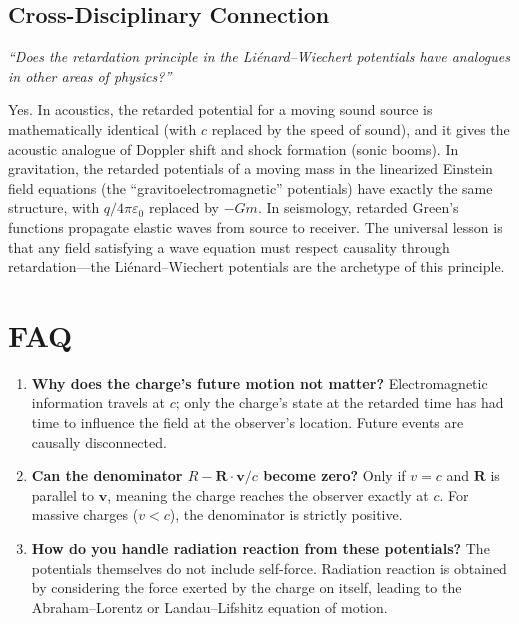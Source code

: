 \documentclass[11pt,openright]{book}
\begin{document}
\subsection*{Cross-Disciplinary Connection}
\textit{``Does the retardation principle in the Liénard--Wiechert potentials have analogues in other areas of physics?''}

Yes. In acoustics, the retarded potential for a moving sound source is mathematically identical (with $c$ replaced by the speed of sound), and it gives the acoustic analogue of Doppler shift and shock formation (sonic booms). In gravitation, the retarded potentials of a moving mass in the linearized Einstein field equations (the ``gravitoelectromagnetic'' potentials) have exactly the same structure, with $q/4\pi\varepsilon_{0}$ replaced by $-Gm$. In seismology, retarded Green's functions propagate elastic waves from source to receiver. The universal lesson is that any field satisfying a wave equation must respect causality through retardation---the Liénard--Wiechert potentials are the archetype of this principle.

\section*{FAQ}

\begin{enumerate}
\item \textbf{Why does the charge's future motion not matter?}
Electromagnetic information travels at $c$; only the charge's state at the retarded time has had time to influence the field at the observer's location. Future events are causally disconnected.

\item \textbf{Can the denominator $R - \mathbf{R}\cdot\mathbf{v}/c$ become zero?}
Only if $v = c$ and $\mathbf{R}$ is parallel to $\mathbf{v}$, meaning the charge reaches the observer exactly at $c$. For massive charges ($v < c$), the denominator is strictly positive.

\item \textbf{How do you handle radiation reaction from these potentials?}
The potentials themselves do not include self-force. Radiation reaction is obtained by considering the force exerted by the charge on itself, leading to the Abraham--Lorentz or Landau--Lifshitz equation of motion.
\end{enumerate}
\end{document}
